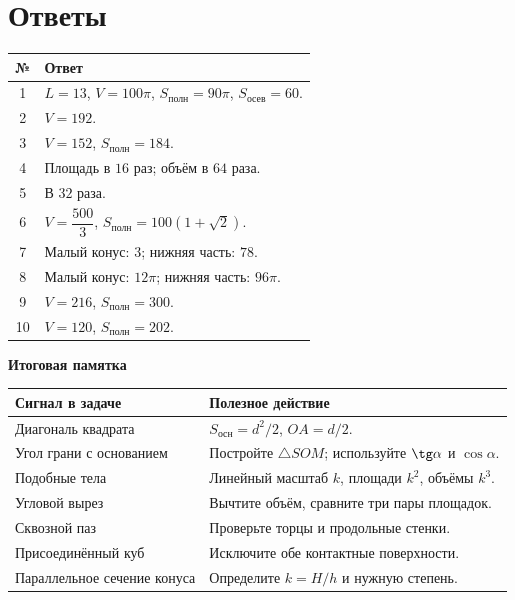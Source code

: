 \documentclass[a4paper,12pt]{article}
\newcommand{\sub}[1]{\par\medskip\textcolor{darkaccent}{\textbf{#1}}\par\smallskip}
\newcommand{\Sos}{S_{\text{осн}}}
\newcommand{\Sp}{S_{\text{полн}}}
\begin{document}
\section*{Ответы}
\renewcommand{\arraystretch}{1.22}
\begin{tabularx}{\linewidth}{@{}cX@{}}
\toprule
№ & Ответ\\\midrule
1 & $L=13$, $V=100\pi$, $\Sp=90\pi$, $S_{\text{осев}}=60$.\\
2 & $V=192$.\\
3 & $V=152$, $\Sp=184$.\\
4 & Площадь в $16$ раз; объём в $64$ раза.\\
5 & В $32$ раза.\\
6 & $V=\dfrac{500}{3}$, $\Sp=100(1+\sqrt2)$.\\
7 & Малый конус: $3$; нижняя часть: $78$.\\
8 & Малый конус: $12\pi$; нижняя часть: $96\pi$.\\
9 & $V=216$, $\Sp=300$.\\
10 & $V=120$, $\Sp=202$.\\\bottomrule
\end{tabularx}
\vspace{8mm}
\sub{Итоговая памятка}
\begin{tabularx}{\linewidth}{@{}p{.38\linewidth}X@{}}
\toprule
Сигнал в задаче & Полезное действие\\\midrule
Диагональ квадрата & $\Sos=d^2/2$, $OA=d/2$.\\
Угол грани с основанием & Постройте $\triangle SOM$; используйте $\tg\alpha$ и $\cos\alpha$.\\
Подобные тела & Линейный масштаб $k$, площади $k^2$, объёмы $k^3$.\\
Угловой вырез & Вычтите объём, сравните три пары площадок.\\
Сквозной паз & Проверьте торцы и продольные стенки.\\
Присоединённый куб & Исключите обе контактные поверхности.\\
Параллельное сечение конуса & Определите $k=H/h$ и нужную степень.\\\bottomrule
\end{tabularx}
\end{document}
